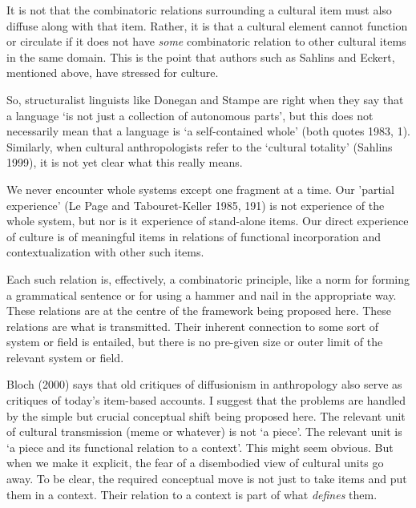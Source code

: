 It is not that the combinatoric relations surrounding a cultural item 
must also diffuse along with that item. Rather, it is that a cultural 
element cannot function or circulate if it does not have \textit{some} 
combinatoric relation to other cultural items in the same domain. This 
is the point that authors such as Sahlins and Eckert, mentioned above, 
have stressed for culture.



So, structuralist linguists like Donegan and Stampe are right when they 
say that a language \textquoteleft is not just a collection of autonomous parts', but 
this does not necessarily mean that a language is \textquoteleft a self-contained 
whole' (both quotes 1983, 1). Similarly, when cultural anthropologists 
refer to the \textquoteleft cultural totality' (Sahlins 1999), it is not yet clear 
what this really means. 



We never encounter whole systems except one fragment at a time. Our 
'partial experience' (Le Page and Tabouret-Keller 1985, 191) is not 
experience of the whole system, but nor is it experience of stand-alone 
items. Our direct experience of culture is of meaningful items in 
relations of functional incorporation and contextualization with other 
such items. 



Each such relation is, effectively, a combinatoric principle, like a 
norm for forming a grammatical sentence or for using a hammer and nail 
in the appropriate way. These relations are at the centre of the 
framework being proposed here. These relations are what is transmitted. 
Their inherent connection to some sort of system or field is entailed, 
but there is no pre-given size or outer limit of the relevant system or 
field.



Bloch (2000) says that old critiques of diffusionism in anthropology 
also serve as critiques of today's item-based accounts. I suggest that 
the problems are handled by the simple but crucial conceptual shift 
being proposed here. The relevant unit of cultural transmission (meme or 
whatever) is not \textquoteleft a piece'. The relevant unit is \textquoteleft a piece and its 
functional relation to a context'. This might seem obvious. But when we 
make it explicit, the fear of a disembodied view of cultural units go 
away. To be clear, the required conceptual move is not just to take 
items and put them in a context. Their relation to a context is part of 
what \textit{defines} them. 




